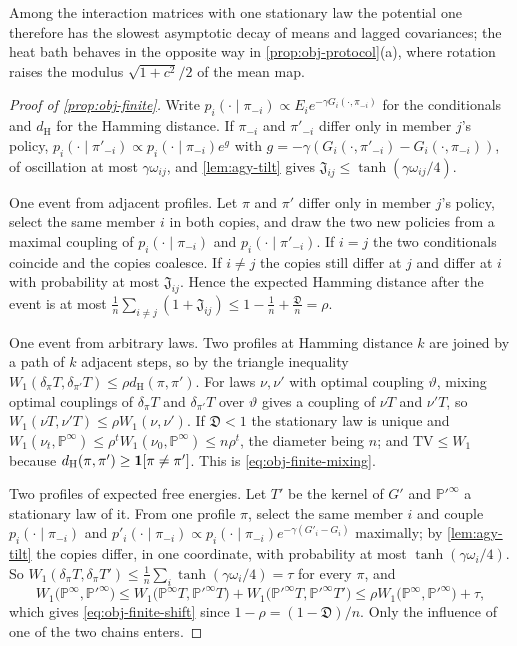Among the interaction matrices with one stationary law the potential one therefore has the slowest asymptotic decay of means and lagged covariances; the heat bath behaves in the opposite way in \cref{prop:obj-protocol}(a), where rotation raises the modulus $\sqrt{1+c^2}/2$ of the mean map.

\begin{proof}[Proof of \cref{prop:obj-finite}]
Write $p_i(\cdot\mid\pi_{-i})\propto E_ie^{-\gamma G_i(\cdot,\pi_{-i})}$ for the conditionals and $d_{\mathrm H}$ for the Hamming distance. If $\pi_{-i}$ and $\pi'_{-i}$ differ only in member $j$'s policy, $p_i(\cdot\mid\pi'_{-i})\propto p_i(\cdot\mid\pi_{-i})e^g$ with $g=-\gamma(G_i(\cdot,\pi'_{-i})-G_i(\cdot,\pi_{-i}))$, of oscillation at most $\gamma\omega_{ij}$, and \cref{lem:agy-tilt} gives $\mathfrak J_{ij}\le\tanh(\gamma\omega_{ij}/4)$.

One event from adjacent profiles. Let $\pi$ and $\pi'$ differ only in member $j$'s policy, select the same member $i$ in both copies, and draw the two new policies from a maximal coupling of $p_i(\cdot\mid\pi_{-i})$ and $p_i(\cdot\mid\pi'_{-i})$. If $i=j$ the two conditionals coincide and the copies coalesce. If $i\neq j$ the copies still differ at $j$ and differ at $i$ with probability at most $\mathfrak J_{ij}$. Hence the expected Hamming distance after the event is at most $\frac1n\sum_{i\ne j}(1+\mathfrak J_{ij})\le1-\frac1n+\frac{\mathfrak D}n=\rho$.

One event from arbitrary laws. Two profiles at Hamming distance $k$ are joined by a path of $k$ adjacent steps, so by the triangle inequality $W_1(\delta_\pi T,\delta_{\pi'}T)\le\rho d_{\mathrm H}(\pi,\pi')$. For laws $\nu,\nu'$ with optimal coupling $\vartheta$, mixing optimal couplings of $\delta_\pi T$ and $\delta_{\pi'}T$ over $\vartheta$ gives a coupling of $\nu T$ and $\nu'T$, so $W_1(\nu T,\nu'T)\le\rho W_1(\nu,\nu')$. If $\mathfrak D<1$ the stationary law is unique and $W_1(\nu_t,\mathbb P^\infty)\le\rho^tW_1(\nu_0,\mathbb P^\infty)\le n\rho^t$, the diameter being $n$; and $\mathrm{TV}\le W_1$ because $d_{\mathrm H}(\pi,\pi')\ge\mathbf{1}[\pi\neq\pi']$. This is \eqref{eq:obj-finite-mixing}.

Two profiles of expected free energies. Let $T'$ be the kernel of $G'$ and $\mathbb P'^\infty$ a stationary law of it. From one profile $\pi$, select the same member $i$ and couple $p_i(\cdot\mid\pi_{-i})$ and $p'_i(\cdot\mid\pi_{-i})\propto p_i(\cdot\mid\pi_{-i})e^{-\gamma(G'_i-G_i)}$ maximally; by \cref{lem:agy-tilt} the copies differ, in one coordinate, with probability at most $\tanh(\gamma\omega_i/4)$. So $W_1(\delta_\pi T,\delta_\pi T')\le\frac1n\sum_i\tanh(\gamma\omega_i/4)=\tau$ for every $\pi$, and
\begin{equation*}
W_1\bigl(\mathbb P^\infty,\mathbb P'^\infty\bigr)\le W_1\bigl(\mathbb P^\infty T,\mathbb P'^\infty T\bigr)+W_1\bigl(\mathbb P'^\infty T,\mathbb P'^\infty T'\bigr)\le\rho W_1\bigl(\mathbb P^\infty,\mathbb P'^\infty\bigr)+\tau,
\end{equation*}
which gives \eqref{eq:obj-finite-shift} since $1-\rho=(1-\mathfrak D)/n$. Only the influence of one of the two chains enters.


\end{proof}
